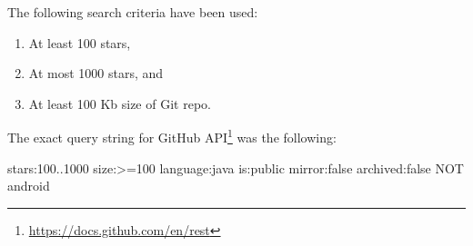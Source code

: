 The following search criteria have been used:
\begin{enumerate}
\item At least 100 stars,
\item At most 1000 stars,
and
\item At least 100 Kb size of Git repo.
\end{enumerate}
The exact query string for
 GitHub API\footnote{\url{https://docs.github.com/en/rest}}
 was the following:
\begin{ffcode}
stars:100..1000
size:>=100
language:java
is:public
mirror:false
archived:false
NOT
android
\end{ffcode}